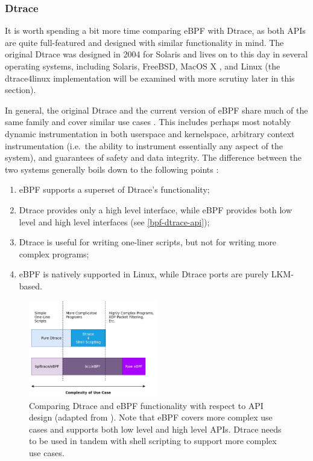\documentclass[
  12pt]{findlay}
\providecommand{\tightlist}{\setlength{\itemsep}{0pt}\setlength{\parskip}{0pt}}
\begin{document}
\hypertarget{dtrace}{%
\subsubsection{Dtrace}\label{dtrace}}

It is worth spending a bit more time comparing eBPF with Dtrace, as both
APIs are quite full-featured and designed with similar functionality in
mind. The original Dtrace \autocite{cantrill04} was designed in 2004 for
Solaris and lives on to this day in several operating systems, including
Solaris, FreeBSD, MacOS X \autocite{gregg14}, and Linux
\autocite{dtrace4linux} (the dtrace4linux implementation will be
examined with more scrutiny later in this section).

In general, the original Dtrace and the current version of eBPF share
much of the same family and cover similar use cases
\autocite{cantrill04,starovoitov13,starovoitov14}. This includes perhaps
most notably dynamic instrumentation in both userspace and kernelspace,
arbitrary context instrumentation (i.e.~the ability to instrument
essentially any aspect of the system), and guarantees of safety and data
integrity. The difference between the two systems generally boils down
to the following points \autocite{gregg14,gregg19bpf}:

\begin{enumerate}
\def\labelenumi{\arabic{enumi})}
\tightlist
\item
  eBPF supports a superset of Dtrace's functionality;
\item
  Dtrace provides only a high level interface, while eBPF provides both
  low level and high level interfaces (see \autoref{bpf-dtrace-api});
\item
  Dtrace is useful for writing one-liner scripts, but not for writing
  more complex programs;
\item
  eBPF is natively supported in Linux, while Dtrace ports are purely
  LKM-based.
\end{enumerate}

\begin{figure}
\includegraphics[width=0.5\textwidth]{../figures/bpf-dtrace-api.png}
\caption[Comparing Dtrace and eBPF functionality with respect to API design]
{
Comparing Dtrace and eBPF functionality with respect to API design (adapted from \cite{gregg18}).
Note that eBPF covers more complex use cases and supports both low level
and high level APIs. Dtrace needs to be used in tandem with shell
scripting to support more complex use cases.
}
\label{bpf-dtrace-api}
\end{figure}
\end{document}
